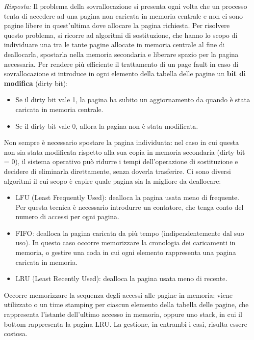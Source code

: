 \documentclass{article}
\newenvironment{solution}
    {\textit{Risposta:}}
    {}
\begin{document}
\begin{solution}
Il problema della sovrallocazione si presenta ogni volta che un processo tenta di accedere ad una pagina non caricata in memoria centrale e non ci sono pagine libere in quest’ultima dove allocare la pagina richiesta.
\newline
Per risolvere questo problema, si ricorre ad algoritmi di sostituzione, che hanno lo scopo di individuare una tra le tante pagine allocate in memoria centrale al fine di deallocarla, spostarla nella memoria secondaria e liberare spazio per la pagina necessaria.
\newline
Per rendere più efficiente il trattamento di un page fault in caso di sovrallocazione si introduce in ogni elemento della tabella delle pagine un \textbf{bit di modifica} (dirty bit):
\begin{itemize}
    \item Se il dirty bit vale 1, la pagina ha subito un aggiornamento da quando è stata caricata in memoria centrale. 
    \item Se il dirty bit vale 0, allora la pagina non è stata modificata.
\end{itemize}
Non sempre è necessario spostare la pagina individuata: nel caso in cui questa non sia stata modificata rispetto alla sua copia in memoria secondaria (dirty bit = 0), il sistema operativo può ridurre i tempi dell’operazione di sostituzione e decidere di eliminarla direttamente, senza doverla trasferire.
\newline
Ci sono diversi algoritmi il cui scopo è capire quale pagina sia la migliore da deallocare:
\begin{itemize}
    \item LFU (Least Frequently Used): dealloca la pagina usata meno di frequente.\newline
    Per questa tecnica è necessario introdurre un contatore, che tenga conto del numero di accessi per ogni pagina.
    \item FIFO: dealloca la pagina caricata da più tempo (indipendentemente dal suo uso).
In questo caso occorre memorizzare la cronologia dei caricamenti in memoria, o gestire una coda in cui ogni elemento rappresenta una pagina caricata in memoria.
    \item LRU (Least Recently Used): dealloca la pagina usata meno di recente.
\end{itemize}
Occorre memorizzare la sequenza degli accessi alle pagine in memoria; viene utilizzato o un time stamping per ciascun elemento della tabella delle pagine, che rappresenta l’istante dell’ultimo accesso in memoria, oppure uno stack, in cui il bottom rappresenta la pagina LRU.
\newline
La gestione, in entrambi i casi, risulta essere costosa.
\end{solution}
\end{document}
